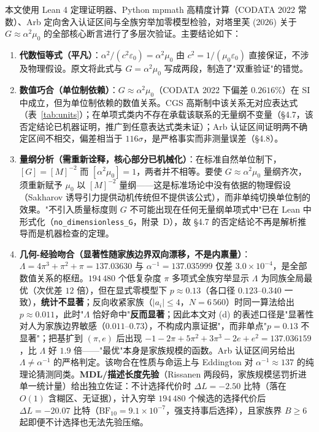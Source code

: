 \documentclass[12pt,a4paper]{article}
\begin{document}
本文使用 Lean 4 定理证明器、Python mpmath 高精度计算（CODATA 2022 常数）、Arb 定向舍入认证区间与全族穷举加零模型检验，对塔里芙 (2026) 关于 $G \approx \alpha^2\mu_0$ 的全部核心断言进行了多层次验证。主要结论如下：

\begin{enumerate}
  \item \textbf{代数恒等式（平凡）}：$\alpha^2/(c^2\varepsilon_0) = \alpha^2\mu_0$ 由 $c^2 = 1/(\mu_0\varepsilon_0)$ 直接保证，不涉及物理假设。原文将此式与 $G = \alpha^2\mu_0$ 写成两段，制造了"双重验证"的错觉。

  \item \textbf{数值巧合（单位制依赖）}：$G \approx \alpha^2\mu_0$（CODATA 2022 下偏差 $0.2616\%$）在 SI 中成立，但为单位制依赖的数值关系。CGS 高斯制中该关系无对应表达式（表~\ref{tab:units}）；在单项式类内不存在承载该联系的无量纲不变量（§4.7，该否定结论已机器证明，推广到任意表达式类未证）；Arb 认证区间证明两不确定区间不相交，偏差相当于 $116\sigma$，是严格事实而非测量误差（§4.8）。

  \item \textbf{量纲分析（需重新诠释，核心部分已机械化）}：在标准自然单位制下，$[G] = [M]^{-2}$ 而 $[\alpha^2\mu_0] = 1$，两者并不相等。要使 $G \approx \alpha^2\mu_0$ 量纲齐次，须重新赋予 $\mu_0$ 以 $[M]^{-2}$ 量纲——这是标准场论中没有依据的物理假设（Sakharov 诱导引力\cite{sakharov1967}提供动机传统但不提供该公式），而非单纯切换单位制的效果。"不引入质量标度则 $G$ 不可能出现在任何无量纲单项式中"已在 Lean 中形式化（\texttt{no\_\allowbreak{}dimensionless\_\allowbreak{}G}，附录~D），故 §4.7 的否定结论不再是解析推导而是机器检查的定理。

  \item \textbf{几何-经验吻合（显著性随家族边界双向漂移，不是内禀量）}：$\Lambda = 4\pi^3+\pi^2+\pi = 137.03630$ 与 $\alpha^{-1} = 137.035999$ 仅差 $3.0\times10^{-4}$，是全部数值关系的枢纽。$194\,480$ 个低复杂度 $\pi$ 多项式全族穷举显示 $\Lambda$ 为同族全局最优（次优差 $12$ 倍），但在显式零模型下 $p \approx 0.13$（各口径 $0.123$--$0.340$ 一致），\textbf{统计不显著}；反向收紧家族（$\lvert a_i\rvert\le4$，$N=6\,560$）时同一算法给出 $p\approx 0.011$，此时"$\Lambda$ 恰好命中"\textbf{反而显著}；因此本文对 (d) 的表述口径是"显著性对人为家族边界敏感（$0.011$--$0.73$），不构成内禀证据"，而非单点"$p=0.13$ 不显著"；把基扩到 $(\pi, e)$ 后出现 $-1-2\pi+5\pi^2+3\pi^3-2e+e^2 = 137.036159$，比 $\Lambda$ 好 $1.9$ 倍——"最优"本身是家族规模的函数。Arb 认证区间另给出 $\Lambda \neq \alpha^{-1}$ 的严格判定。该吻合在性质与命运上与 Eddington 对 $\alpha^{-1} \approx 137$ 的纯理论猜测同类。\textbf{MDL/描述长度先验}（Rissanen 两段码，家族规模惩罚折进单一统计量）给出独立佐证：不计选择代价时 $\Delta L = -2.50$ 比特（落在 $O(1)$ 含糊区、无证据），计入穷举 $194\,480$ 个候选的选择代价后 $\Delta L = -20.07$ 比特（$\mathrm{BF}_{10} = 9.1\times10^{-7}$，强支持事后选择），且家族界 $B\ge6$ 起即便不计选择也无法先验压缩。


\end{enumerate}
\end{document}
